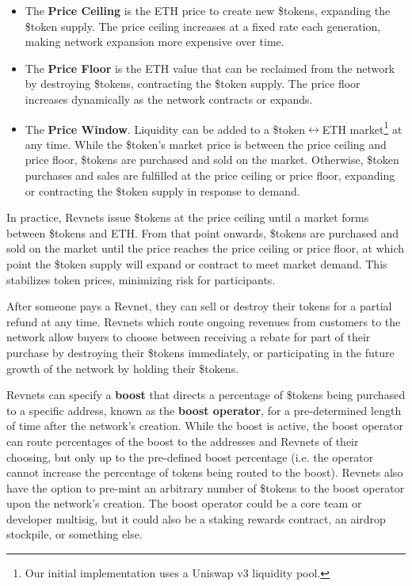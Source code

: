 \documentclass{article}
\begin{document}
\begin{itemize}
  \item The \textbf{Price Ceiling} is the ETH price to create new \$tokens, expanding the \$token supply. The price ceiling increases at a fixed rate each generation, making network expansion more expensive over time.
  \item The \textbf{Price Floor} is the ETH value that can be reclaimed from the network by destroying \$tokens, contracting the \$token supply. The price floor increases dynamically as the network contracts or expands.
  \item The \textbf{Price Window}. Liquidity can be added to a \$token$\leftrightarrow$ETH market\footnote{Our initial implementation uses a Uniswap v3 liquidity pool.} at any time. While the \$token's market price is between the price ceiling and price floor, \$tokens are purchased and sold on the market. Otherwise, \$token purchases and sales are fulfilled at the price ceiling or price floor, expanding or contracting the \$token supply in response to demand.
\end{itemize}

In practice, Revnets issue \$tokens at the price ceiling until a market forms between \$tokens and ETH. From that point onwards, \$tokens are purchased and sold on the market until the price reaches the price ceiling or price floor, at which point the \$token supply will expand or contract to meet market demand. This stabilizes token prices, minimizing risk for participants.

After someone pays a Revnet, they can sell or destroy their tokens for a partial refund at any time. Revnets which route ongoing revenues from customers to the network allow buyers to choose between receiving a rebate for part of their purchase by destroying their \$tokens immediately, or participating in the future growth of the network by holding their \$tokens.

Revnets can specify a \textbf{boost} that directs a percentage of \$tokens being purchased to a specific address, known as the \textbf{boost operator}, for a pre-determined length of time after the network's creation. While the boost is active, the boost operator can route percentages of the boost to the addresses and Revnets of their choosing, but only up to the pre-defined boost percentage (i.e. the operator cannot increase the percentage of tokens being routed to the boost). Revnets also have the option to pre-mint an arbitrary number of \$tokens to the boost operator upon the network's creation. The boost operator could be a core team or developer multisig, but it could also be a staking rewards contract, an airdrop stockpile, or something else. 
\end{document}

